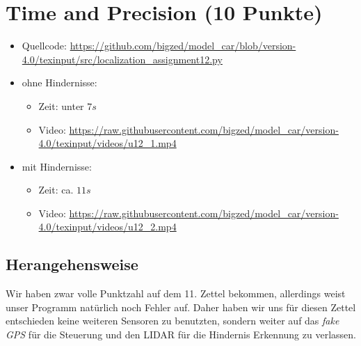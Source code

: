 \documentclass[10pt,oneside,a4paper]{article}
\begin{document}
\section{Time and Precision (10 Punkte)}
    \begin{itemize}
      \item Quellcode:
        \url{https://github.com/bigzed/model_car/blob/version-4.0/texinput/src/localization_assignment12.py}
      \item ohne Hindernisse:
        \begin{itemize}
          \item Zeit: unter $ 7s $
          \item Video:
          \url{https://raw.githubusercontent.com/bigzed/model_car/version-4.0/texinput/videos/u12_1.mp4}
        \end{itemize}
      \item mit Hindernisse:
        \begin{itemize}
          \item Zeit: ca. $ 11s $
          \item Video:
            \url{https://raw.githubusercontent.com/bigzed/model_car/version-4.0/texinput/videos/u12_2.mp4}
        \end{itemize}
    \end{itemize}

    \subsection{Herangehensweise}
      Wir haben zwar volle Punktzahl auf dem 11. Zettel bekommen, allerdings weist unser Programm
      nat\"urlich noch Fehler auf. Daher haben wir uns f\"ur diesen Zettel entschieden keine
      weiteren Sensoren zu benutzten, sondern weiter auf das \emph{fake GPS} f\"ur die Steuerung und
      den LIDAR f\"ur die Hindernis Erkennung zu verlassen.
\end{document}
